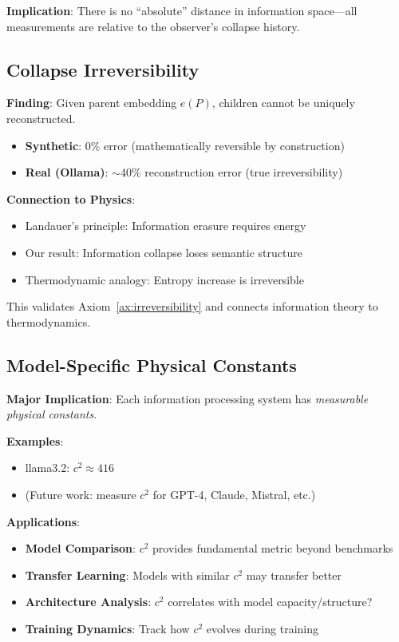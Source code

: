 \documentclass[11pt,a4paper]{article}
\begin{document}
\textbf{Implication}: There is no ``absolute'' distance in information space---all measurements are relative to the observer's collapse history.

\subsection{Collapse Irreversibility}

\textbf{Finding}: Given parent embedding $e(P)$, children cannot be uniquely reconstructed.

\begin{itemize}
    \item \textbf{Synthetic}: 0\% error (mathematically reversible by construction)
    \item \textbf{Real (Ollama)}: $\sim$40\% reconstruction error (true irreversibility)
\end{itemize}

\textbf{Connection to Physics}:
\begin{itemize}
    \item Landauer's principle: Information erasure requires energy
    \item Our result: Information collapse loses semantic structure
    \item Thermodynamic analogy: Entropy increase is irreversible
\end{itemize}

This validates Axiom~\ref{ax:irreversibility} and connects information theory to thermodynamics.

\subsection{Model-Specific Physical Constants}

\textbf{Major Implication}: Each information processing system has \emph{measurable physical constants}.

\textbf{Examples}:
\begin{itemize}
    \item llama3.2: $c^2 \approx 416$
    \item (Future work: measure $c^2$ for GPT-4, Claude, Mistral, etc.)
\end{itemize}

\textbf{Applications}:
\begin{itemize}
    \item \textbf{Model Comparison}: $c^2$ provides fundamental metric beyond benchmarks
    \item \textbf{Transfer Learning}: Models with similar $c^2$ may transfer better
    \item \textbf{Architecture Analysis}: $c^2$ correlates with model capacity/structure?
    \item \textbf{Training Dynamics}: Track how $c^2$ evolves during training
\end{itemize}
\end{document}
